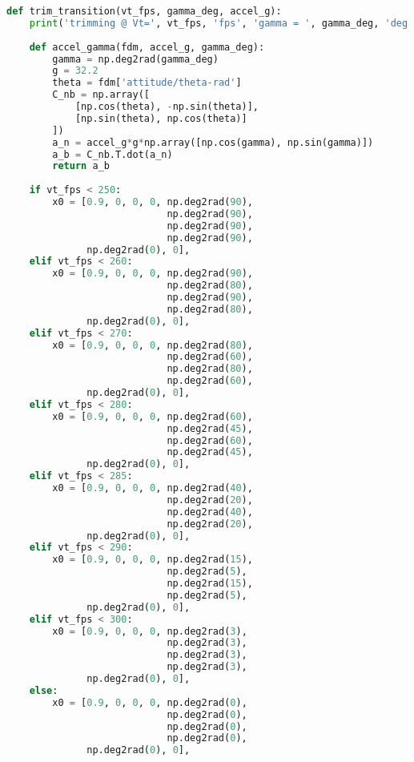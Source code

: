\begin{lstlisting}[language=Python]
def trim_transition(vt_fps, gamma_deg, accel_g):
    print('trimming @ Vt=', vt_fps, 'fps', 'gamma = ', gamma_deg, 'deg')
    
    def accel_gamma(fdm, accel_g, gamma_deg):
        gamma = np.deg2rad(gamma_deg)
        g = 32.2
        theta = fdm['attitude/theta-rad']
        C_nb = np.array([
            [np.cos(theta), -np.sin(theta)],
            [np.sin(theta), np.cos(theta)]
        ])
        a_n = accel_g*g*np.array([np.cos(gamma), np.sin(gamma)])
        a_b = C_nb.T.dot(a_n)
        return a_b
    
    if vt_fps < 250:
        x0 = [0.9, 0, 0, 0, np.deg2rad(90), 
                            np.deg2rad(90),
                            np.deg2rad(90),
                            np.deg2rad(90),
              np.deg2rad(0), 0],
    elif vt_fps < 260:
        x0 = [0.9, 0, 0, 0, np.deg2rad(90), 
                            np.deg2rad(80),
                            np.deg2rad(90),
                            np.deg2rad(80),
              np.deg2rad(0), 0],
    elif vt_fps < 270:
        x0 = [0.9, 0, 0, 0, np.deg2rad(80), 
                            np.deg2rad(60),
                            np.deg2rad(80),
                            np.deg2rad(60),
              np.deg2rad(0), 0],
    elif vt_fps < 280:
        x0 = [0.9, 0, 0, 0, np.deg2rad(60), 
                            np.deg2rad(45),
                            np.deg2rad(60),
                            np.deg2rad(45),
              np.deg2rad(0), 0],
    elif vt_fps < 285:
        x0 = [0.9, 0, 0, 0, np.deg2rad(40), 
                            np.deg2rad(20),
                            np.deg2rad(40),
                            np.deg2rad(20),
              np.deg2rad(0), 0],
    elif vt_fps < 290:
        x0 = [0.9, 0, 0, 0, np.deg2rad(15), 
                            np.deg2rad(5),
                            np.deg2rad(15),
                            np.deg2rad(5),
              np.deg2rad(0), 0],
    elif vt_fps < 300:
        x0 = [0.9, 0, 0, 0, np.deg2rad(3), 
                            np.deg2rad(3),
                            np.deg2rad(3),
                            np.deg2rad(3),
              np.deg2rad(0), 0],
    else:
        x0 = [0.9, 0, 0, 0, np.deg2rad(0),
                            np.deg2rad(0),
                            np.deg2rad(0),
                            np.deg2rad(0),
              np.deg2rad(0), 0],


\end{lstlisting}
